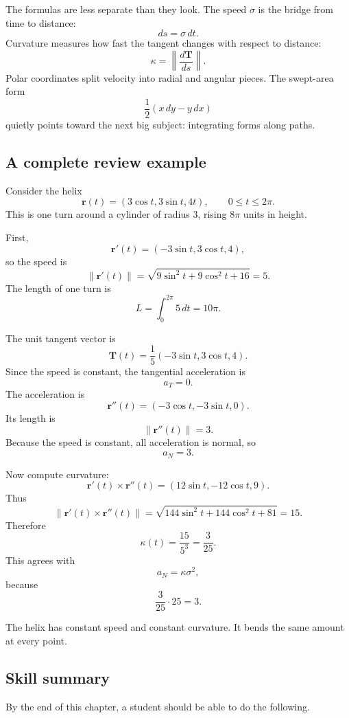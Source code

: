The formulas are less separate than they look.  The speed \(\sigma\) is the bridge from
time to distance:
\[
    ds=\sigma\,dt.
\]
Curvature measures how fast the tangent changes with respect to distance:
\[
    \kappa=\left\|\frac{d\mathbf T}{ds}\right\|.
\]
Polar coordinates split velocity into radial and angular pieces.  The swept-area form
\[
    \frac12(x\,dy-y\,dx)
\]
quietly points toward the next big subject: integrating forms along paths.

\subsection{A complete review example}

Consider the helix
\[
    \mathbf r(t)=(3\cos t,3\sin t,4t),
    \qquad 0\le t\le2\pi.
\]
This is one turn around a cylinder of radius \(3\), rising \(8\pi\) units in height.

First,
\[
    \mathbf r'(t)=(-3\sin t,3\cos t,4),
\]
so the speed is
\[
    \|\mathbf r'(t)\|
    =
    \sqrt{9\sin^2t+9\cos^2t+16}
    =
    5.
\]
The length of one turn is
\[
    L=\int_0^{2\pi}5\,dt=10\pi.
\]

The unit tangent vector is
\[
    \mathbf T(t)=\frac15(-3\sin t,3\cos t,4).
\]
Since the speed is constant, the tangential acceleration is
\[
    a_T=0.
\]
The acceleration is
\[
    \mathbf r''(t)=(-3\cos t,-3\sin t,0).
\]
Its length is
\[
    \|\mathbf r''(t)\|=3.
\]
Because the speed is constant, all acceleration is normal, so
\[
    a_N=3.
\]

Now compute curvature:
\[
    \mathbf r'(t)\times\mathbf r''(t)
    =
    (12\sin t,-12\cos t,9).
\]
Thus
\[
    \|\mathbf r'(t)\times\mathbf r''(t)\|
    =
    \sqrt{144\sin^2t+144\cos^2t+81}
    =
    15.
\]
Therefore
\[
    \kappa(t)=\frac{15}{5^3}=\frac{3}{25}.
\]
This agrees with
\[
    a_N=\kappa\sigma^2,
\]
because
\[
    \frac{3}{25}\cdot 25=3.
\]

The helix has constant speed and constant curvature.  It bends the same amount at
every point.

\subsection{Skill summary}

By the end of this chapter, a student should be able to do the following.

